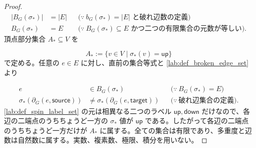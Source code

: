 \documentclass[11pt,a4paper]{article}
\theoremstyle{remark}
\begin{document}
\begin{proof}
\[\begin{aligned}
|B_G(\sigma_*)|
&=|E|
&&\bigl(\because\ b_G(\sigma_*)=|E|\text{ と破れ辺数の定義}\bigr)\\
B_G(\sigma_*)
&=E
&&\bigl(\because\ B_G(\sigma_*)\subseteq E\text{ かつ二つの有限集合の元数が等しい}\bigr).
\end{aligned}\]
頂点部分集合 
$A_*\subseteq V$
 を

\[A_*:=\{v\in V\mid \sigma_*(v)=\mathsf{up}\}\]
で定める。任意の 
$e\in E$
 に対し、直前の集合等式と 
\cref{lab:def_broken_edge_set}
 より

\[\begin{aligned}
e
&\in B_G(\sigma_*)
&&\bigl(\because\ B_G(\sigma_*)=E\bigr)\\
\sigma_*\!\left(\partial_G(e,\mathsf{source})\right)
&\ne
\sigma_*\!\left(\partial_G(e,\mathsf{target})\right)
&&\bigl(\because\ \text{破れ辺集合の定義}\bigr).
\end{aligned}\]
\cref{lab:def_spin_label_set}
 の元は相異なる二つのラベル 
$\mathsf{up},\mathsf{down}$
 だけなので、各辺の二端点のうちちょうど一方の 
$\sigma_*$
 値が 
$\mathsf{up}$
 である。したがって各辺の二端点のうちちょうど一方だけが 
$A_*$
 に属する。全ての集合は有限であり、多重度と辺数は自然数に属する。実数、複素数、極限、積分を用いない。

\end{proof}
\end{document}
